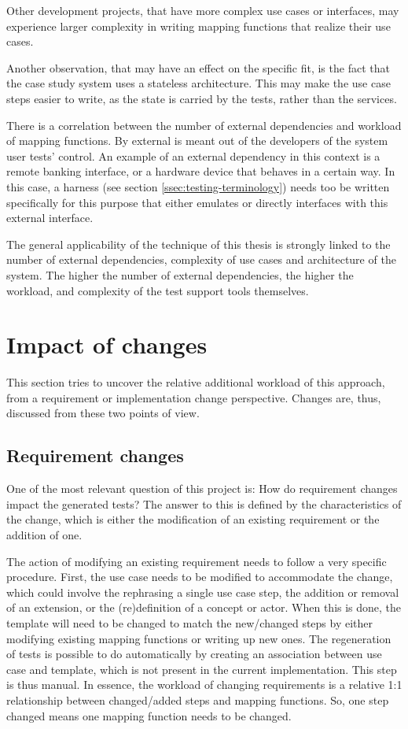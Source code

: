 \noindent Other development projects, that have more complex use cases or interfaces, may experience larger complexity in writing mapping functions that realize their use cases.\medskip

\noindent Another observation, that may have an effect on the specific fit, is the fact that the case study system uses a stateless architecture. This may make the use case steps easier to write, as the state is carried by the tests, rather than the services.\medskip

\noindent There is a correlation between the number of external dependencies and workload of mapping functions. By external is meant out of the developers of the system user tests' control. An example of an external dependency in this context is a remote banking interface, or a hardware device that behaves in a certain way. In this case, a harness (see section \ref{ssec:testing-terminology}) needs too be written specifically for this purpose that either emulates or directly interfaces with this external interface.\bigskip

\noindent The general applicability of the technique of this thesis is strongly linked to the number of external dependencies, complexity of use cases and architecture of the system. The higher the number of external dependencies, the higher the workload, and complexity of the test support tools themselves.

\section{Impact of changes}
\label{sec:impact-of-changes}
This section tries to uncover the relative additional workload of this approach, from a requirement or implementation change perspective. Changes are, thus, discussed from these two points of view.

\subsection{Requirement changes}
One of the most relevant question of this project is: How do requirement changes impact the generated tests? The answer to this is defined by the characteristics of the change, which is either the modification of an existing requirement or the addition of one.\medskip

\noindent The action of modifying an existing requirement needs to follow a very specific procedure. First, the use case needs to be modified to accommodate the change, which could involve the rephrasing a single use case step, the addition or removal of an extension, or the (re)definition of a concept or actor. When this is done, the template will need to be changed to match the new/changed steps by either modifying existing mapping functions or writing up new ones. The regeneration of tests is possible to do automatically by creating an association between use case and template, which is not present in the current implementation. This step is thus manual. In essence, the workload of changing requirements is a relative 1:1 relationship between changed/added steps and mapping functions. So, one step changed means one mapping function needs to be changed.\medskip

